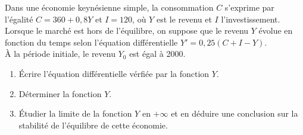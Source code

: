 \documentclass[a4paper,11pt,exos]{nsi} %
\begin{document}
Dans une économie keynésienne simple, la consommation $C$ s'exprime par l'égalité $C=360+0,8Y$ et $I=120$, où $Y$ est le revenu et $I$ l'investissement.\\
Lorsque le marché est hors de l'équilibre, on suppose que le revenu $Y$ évolue en fonction du temps selon l'équation différentielle $Y'=0,25(C+I-Y)$.\\
À la période initiale, le revenu $Y_0$ est égal à 2000.
\begin{enumerate}
    \item Écrire l'équation différentielle vérfiée par la fonction $Y$.
    \item Déterminer la fonction $Y$.
    \item Étudier la limite de la fonction $Y$ en $+\infty$ et en déduire une conclusion sur la stabilité de l'équilibre de cette économie.
\end{enumerate}
\end{document}
